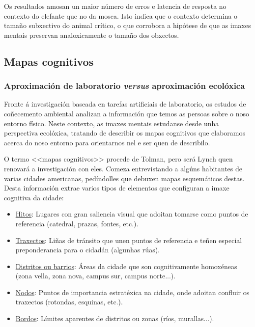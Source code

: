 \documentclass[a4paper,11pt]{article}
\begin{document}
Os resultados amosan un maior número de erros e latencia de resposta no contexto do elefante que no da mosca. Isto indica que o contexto determina o tamaño subxectivo do animal crítico, o que corrobora a hipótese de que as imaxes mentais preservan analoxicamente o tamaño dos obxectos.

\subsection{Mapas cognitivos}
\subsubsection{Aproximación de laboratorio \textit{versus} aproximación ecolóxica}
Fronte á investigación baseada en tarefas artificiais de laboratorio, os estudos de coñecemento ambiental analizan a información que temos as persoas sobre o noso entorno físico. Neste contexto, as imaxes mentais estudanse desde unha perspectiva ecolóxica, tratando de describir os mapas cognitivos que elaboramos acerca do noso entorno para orientarnos nel e ser quen de describilo. 

O termo <<mapas cognitivos>> procede de Tolman, pero será Lynch quen renovará a investigación con eles. Comeza entrevistando a algúns habitantes de varias cidades americanas, pedíndolles que debuxen mapas esquemáticos destas. Desta información extrae varios tipos de elementos que configuran a imaxe cognitiva da cidade:
\begin{itemize}
	\item \underline{Hitos}: Lugares con gran saliencia visual que adoitan tomarse como puntos de 
	referencia (catedral, prazas, fontes, etc.).
	\item \underline{Traxectos}: Liñas de tránsito que unen puntos de referencia e teñen especial 
	preponderancia para o cidadán (algunhas rúas).
	\item \underline{Distritos ou barrios}: Áreas da cidade que son cognitivamente homoxéneas (zona 
	vella, zona nova, campus sur, campus norte...).
	\item \underline{Nodos}: Puntos de importancia estratéxica na cidade, onde adoitan confluir os 
	traxectos (rotondas, esquinas, etc.).
	\item \underline{Bordos}: Límites aparentes de distritos ou zonas (ríos, murallas...).
\end{itemize}
\end{document}
